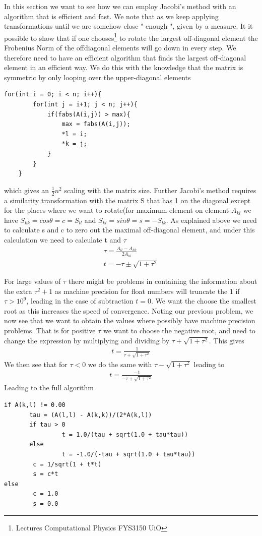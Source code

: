 \documentclass[a4paper,11pt]{article}
\begin{document}
{In this section we want to see how we can employ Jacobi's method with an algorithm that is efficient and fast. We note that as we keep applying transformations until we are somehow close " enough ", given by a measure. It it possible to show that if one chooses\footnote{Lectures Computational Physics FYS3150 UiO} to rotate the largest off-diagonal element the Frobenius Norm of the offdiagonal elements will go down in every step. We therefore need to have an efficient algorithm that finds the largest off-diagonal element in an efficient way. We do this with the knowledge that the matrix is symmetric by only looping over the upper-diagonal elements
\begin{lstlisting}
for(int i = 0; i < n; i++){
        for(int j = i+1; j < n; j++){
            if(fabs(A(i,j)) > max){
                max = fabs(A(i,j));
                *l = i;
                *k = j;
            }
        }
    }
\end{lstlisting}
which gives an $\frac{1}{2}n^{2}$ scaling with the matrix size.  Further Jacobi's method requires a similarity transformation with the matrix S that has 1 on the diagonal except for the places where we want to rotate(for maximum element on element $A_{kl}$ we have $S_{kk}=cos \theta = c = S_{ll}$ and $S_{kl}=sin\theta = s = -S_{lk}$. As explained above we need to calculate s and c to zero out the maximal off-diagonal element, and under this calculation we need to calculate t and $\tau$
\begin{align}
	\tau = \frac{A_{ll}-A_{kk}}{2A_{kl}}  \\
	t = -\tau \pm \sqrt{1+\tau^2}
\end{align}

For large values of $\tau$ there might be problems in containing the information about the extra $\tau^2+1$ as machine precision for float numbers will truncate the 1 if $\tau> 10^9$, leading in the case of subtraction $t=0$. We want the choose the smallest root as this increases the speed of convergence. Noting our previous problem, we now see that we want to obtain the values where possibly have machine precision problems. That is for positive $\tau$ we want to choose the negative root, and need to change the expression by multiplying and dividing by $\tau +\sqrt{1+\tau^2}$. This gives
\begin{align}
 t = \frac{1}{\tau+\sqrt{1+\tau^2}}
\end{align}
We then see that for $\tau<0$ we do the same with  $\tau -\sqrt{1+\tau^2}$ leading to
\begin{align}
 t = \frac{-1}{-\tau+\sqrt{1+\tau^2}}
\end{align}
Leading to the full algorithm 
\begin{lstlisting}
if A(k,l) != 0.00
       tau = (A(l,l) - A(k,k))/(2*A(k,l))
       if tau > 0
        		t = 1.0/(tau + sqrt(1.0 + tau*tau))
       else 
        		t = -1.0/(-tau + sqrt(1.0 + tau*tau))
        c = 1/sqrt(1 + t*t)
        s = c*t
else 
        c = 1.0
        s = 0.0
\end{lstlisting}

}
\end{document}
